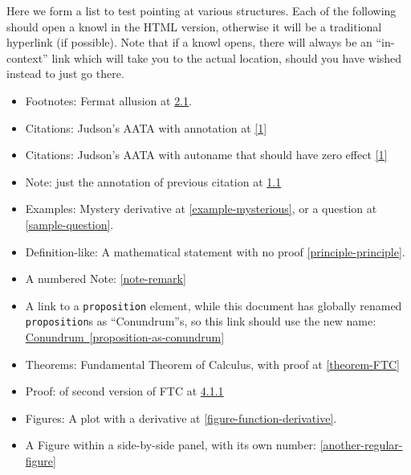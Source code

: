\documentclass[10pt,]{article}
\theoremstyle{plain}
\theoremstyle{definition}
\theoremstyle{definition}
\theoremstyle{definition}
\theoremstyle{definition}
\theoremstyle{definition}
\theoremstyle{definition}
\numberwithin{equation}{section}
\begin{document}
\par
\hypertarget{p-531}{}%
Here we form a list to test pointing at various structures.  Each of the following should open a knowl in the HTML version, otherwise it will be a traditional hyperlink (if possible).  Note that if a knowl opens, there will always be an ``in-context'' link which will take you to the actual location, should you have  wished instead to just go there.\leavevmode%
\begin{itemize}[label=\textbullet]
\item{}\hypertarget{p-532}{}%
Footnotes: Fermat allusion at \hyperref[footnote-fermat]{2.1}.%
\item{}\hypertarget{p-533}{}%
Citations: Judson's AATA with annotation at \hyperlink{biblio-judson-AATA}{[1]}%
\item{}\hypertarget{p-534}{}%
Citations: Judson's AATA with autoname that should have zero effect \hyperlink{biblio-judson-AATA}{[1]}%
\item{}\hypertarget{p-535}{}%
Note: just the annotation of previous citation at \hyperlink{note-judson-AATA}{1.1}%
\item{}\hypertarget{p-536}{}%
Examples: Mystery derivative at \hyperref[example-mysterious]{\ref{example-mysterious}}, or a question at \hyperref[sample-question]{\ref{sample-question}}.%
\item{}\hypertarget{p-537}{}%
Definition-like: A mathematical statement with no proof \hyperref[principle-principle]{\ref{principle-principle}}.%
\item{}\hypertarget{p-538}{}%
A numbered Note: \hyperref[note-remark]{\ref{note-remark}}%
\item{}\hypertarget{p-539}{}%
A link to a \lstinline?proposition? element, while this document has globally renamed \lstinline?proposition?s as ``Conundrum''s, so this link should use the new name: \hyperref[proposition-as-conundrum]{Conundrum~\ref{proposition-as-conundrum}}%
\item{}\hypertarget{p-540}{}%
Theorems: Fundamental Theorem of Calculus, with proof at \hyperref[theorem-FTC]{\ref{theorem-FTC}}%
\item{}\hypertarget{p-541}{}%
Proof: of second version of FTC at \hyperlink{proof-FTC-corollary}{4.1.1}%
\item{}\hypertarget{p-542}{}%
Figures: A plot with a derivative at \hyperref[figure-function-derivative]{\ref{figure-function-derivative}}.%
\item{}\hypertarget{p-543}{}%
A Figure within a side-by-side panel, with its own number: \hyperref[another-regular-figure]{\ref{another-regular-figure}}%

\end{itemize}
\end{document}
